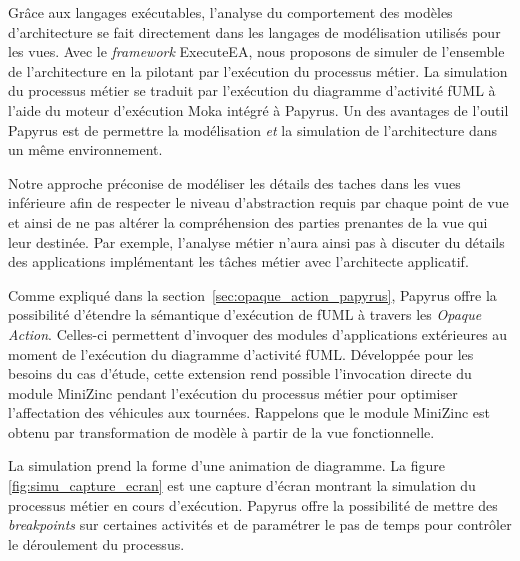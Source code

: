 Grâce aux langages exécutables, l'analyse du comportement des modèles
d'architecture se fait directement dans les langages de modélisation utilisés
pour les vues. Avec le \emph{framework} ExecuteEA, nous proposons de simuler de
l'ensemble de l'architecture en la pilotant par l'exécution du processus métier.
La simulation du processus métier se traduit par l'exécution du diagramme
d'activité fUML à l'aide du moteur d'exécution Moka intégré à Papyrus. Un des
avantages de l'outil Papyrus est de permettre la modélisation \emph{et} la
simulation de l'architecture dans un même environnement.

Notre approche préconise de modéliser les détails des taches dans les vues
inférieure afin de respecter le niveau d'abstraction requis par chaque point de
vue et ainsi de ne pas altérer la compréhension des parties prenantes de la vue
qui leur destinée. Par exemple, l'analyse métier n'aura ainsi pas à discuter du
détails des applications implémentant les tâches métier avec l'architecte
applicatif.

Comme expliqué dans la section~\ref{sec:opaque_action_papyrus}, Papyrus offre la
possibilité d'étendre la sémantique d'exécution de fUML à travers les
\emph{Opaque Action}. Celles-ci permettent d'invoquer des modules d'applications
extérieures au moment de l'exécution du diagramme d'activité fUML.
Développée pour les besoins du cas d'étude, cette extension rend possible l'invocation directe
du module MiniZinc pendant l’exécution du processus métier pour optimiser
l'affectation des véhicules aux tournées. Rappelons que le module MiniZinc est
obtenu par transformation de modèle à partir de la vue fonctionnelle.

La simulation prend la forme d'une animation de diagramme. La figure
\ref{fig:simu_capture_ecran} est une capture d'écran montrant la simulation du processus métier
en cours d'exécution. Papyrus offre la possibilité de mettre des \emph{breakpoints} sur
certaines activités et de paramétrer le pas de temps pour contrôler le
déroulement du processus.

